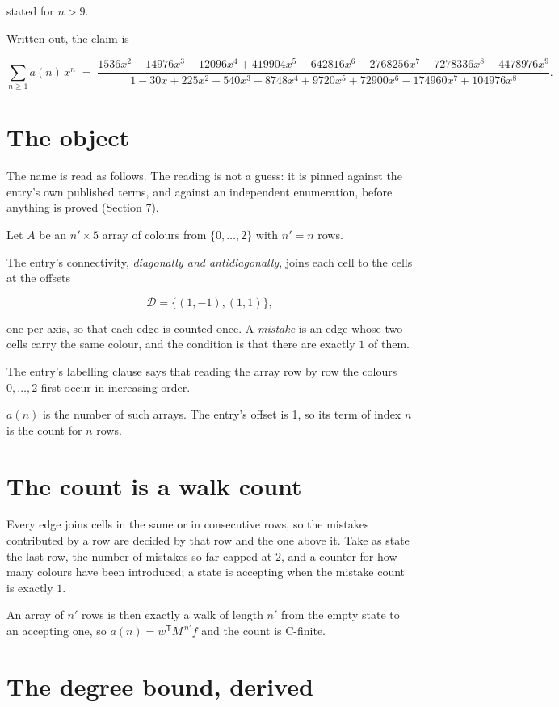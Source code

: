 \documentclass[11pt]{article}
\theoremstyle{definition}
\begin{document}
stated for $n > 9$.

Written out, the claim is

\[\sum_{n \ge 1} a(n)\,x^n \;=\; \frac{1536x^{2} - 14976x^{3} - 12096x^{4} + 419904x^{5} - 642816x^{6} - 2768256x^{7} + 7278336x^{8} - 4478976x^{9}}{1 - 30x + 225x^{2} + 540x^{3} - 8748x^{4} + 9720x^{5} + 72900x^{6} - 174960x^{7} + 104976x^{8}}.\]

\section{The object}

The name is read as follows. The reading is not a guess: it is pinned against the entry's own published terms, and against an independent enumeration, before anything is proved (Section 7).

Let $A$ be an $n' \times 5$ array of colours from $\{0,\dots,2\}$ with $n' = n$ rows.

The entry's connectivity, {\itshape diagonally and antidiagonally}, joins each cell to the cells at the offsets

\[\mathcal{D} = \{(1,-1), (1,1)\},\]

one per axis, so that each edge is counted once. A {\itshape mistake} is an edge whose two cells carry the same colour, and the condition is that there are exactly $1$ of them.

The entry's labelling clause says that reading the array row by row the colours $0,\dots,2$ first occur in increasing order.

$a(n)$ is the number of such arrays. The entry's offset is 1, so its term of index $n$ is the count for $n$ rows.

\section{The count is a walk count}

Every edge joins cells in the same or in consecutive rows, so the mistakes contributed by a row are decided by that row and the one above it. Take as state the last row, the number of mistakes so far capped at $2$, and a counter for how many colours have been introduced; a state is accepting when the mistake count is exactly $1$.

An array of $n'$ rows is then exactly a walk of length $n'$ from the empty state to an accepting one, so $a(n) = w^{\mathsf T}M^{\,n'}f$ and the count is C-finite.

\section{The degree bound, derived}
\end{document}
